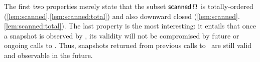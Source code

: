 The first two properties merely state that the subset
$\mathsf{scanned}\,\Omega$ is totally-ordered
(\ref{lem:scanned}.\ref{lem:scanned:total}) and also downward closed
(\ref{lem:scanned}.\ref{lem:scanned:total}). The last property is the
most interesting: it entails that once a snapshot is observed by
\jyscan, its validity will not be compromised by future or ongoing
calls to \jywrite. Thus, snapshots returned from previous calls to
\jyscan~are still valid and observable in the future.

